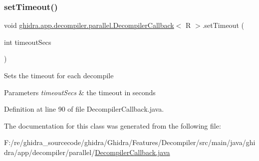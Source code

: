 \subsubsection{\texorpdfstring{setTimeout()}{setTimeout()}}
{\footnotesize\ttfamily void \mbox{\hyperlink{classghidra_1_1app_1_1decompiler_1_1parallel_1_1_decompiler_callback}{ghidra.\+app.\+decompiler.\+parallel.\+Decompiler\+Callback}}$<$ R $>$.set\+Timeout (\begin{DoxyParamCaption}\item[{int}]{timeout\+Secs }\end{DoxyParamCaption})\hspace{0.3cm}{\ttfamily [inline]}}

Sets the timeout for each decompile


\begin{DoxyParams}{Parameters}
{\em timeout\+Secs} & the timeout in seconds \\
\hline
\end{DoxyParams}


Definition at line 90 of file Decompiler\+Callback.\+java.



The documentation for this class was generated from the following file\+:\begin{DoxyCompactItemize}
\item 
F\+:/re/ghidra\+\_\+sourcecode/ghidra/\+Ghidra/\+Features/\+Decompiler/src/main/java/ghidra/app/decompiler/parallel/\mbox{\hyperlink{_decompiler_callback_8java}{Decompiler\+Callback.\+java}}\end{DoxyCompactItemize}

